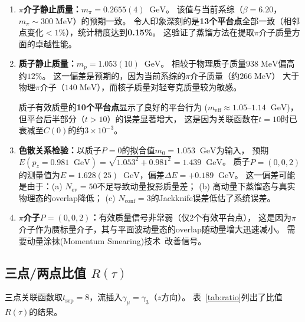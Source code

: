 \documentclass[11pt,a4paper]{article}
\newcommand{\gev}{\;\mathrm{GeV}}
\newcommand{\meff}{m_{\mathrm{eff}}}
\newcommand{\Nev}{N_{\mathrm{ev}}}
\newcommand{\tsep}{t_{\mathrm{sep}}}
\newcommand{\gmu}{\gamma_\mu}
\begin{document}
\begin{enumerate}[leftmargin=*]
\item \textbf{$\pi$介子静止质量：}$m_\pi = 0.2655(4)\;\gev$。
该值与当前系综（$\beta=6.20$，$m_\pi\sim 300\;\mathrm{MeV}$）的预期一致。
令人印象深刻的是\textbf{13个平台点}全部一致（相邻点变化$<1\%$），统计精度达到\textbf{0.15\%}。
这验证了蒸馏方法在提取$\pi$介子质量方面的卓越性能。

\item \textbf{质子静止质量：}$m_p = 1.053(10)\;\gev$。
相较于物理质子质量$938\;\mathrm{MeV}$偏高约$12\%$。
这一偏差是预期的，因为当前系综的$\pi$介子质量（约$266\;\mathrm{MeV}$）
大于物理$\pi$介子（$140\;\mathrm{MeV}$），而核子质量对轻夸克质量较为敏感。

质子有效质量的\textbf{10个平台点}显示了良好的平台行为
($\meff\approx 1.05$--$1.14\;\gev$)，但平台后半部分（$t>10$）的误差显著增大，
这是因为关联函数在$t=10$时已衰减至$C(0)$的约$3\times 10^{-3}$。

\item \textbf{色散关系检验：}以质子$P=0$的拟合值$m_0=1.053\;\gev$为输入，
预期$E(p_z=0.981\;\gev)=\sqrt{1.053^2+0.981^2}=1.439\;\gev$。
质子$P=(0,0,2)$的测量值为$E=1.628(25)\;\gev$，偏差$\Delta E = +0.189\;\gev$。
这一偏差可能是由于：(a) $\Nev=50$不足导致动量投影质量差；
(b) 高动量下蒸馏态与真实物理态的overlap降低；
(c) $N_{\mathrm{conf}}=3$的Jackknife误差低估了系统误差。

\item \textbf{$\pi$介子$P=(0,0,2)$：}有效质量信号非常弱（仅2个有效平台点），
这是因为$\pi$介子作为赝标量介子，其与平面波动量态的overlap随动量增大迅速减小。
需要动量涂抹(Momentum Smearing)技术~\cite{bali2016}改善信号。
\end{enumerate}

\subsection{三点/两点比值 $R(\tau)$}

三点关联函数取$\tsep = 8$，流插入$\gmu=\gamma_3$（$z$方向）。
表~\ref{tab:ratio}列出了比值$R(\tau)$的结果。
\end{document}
